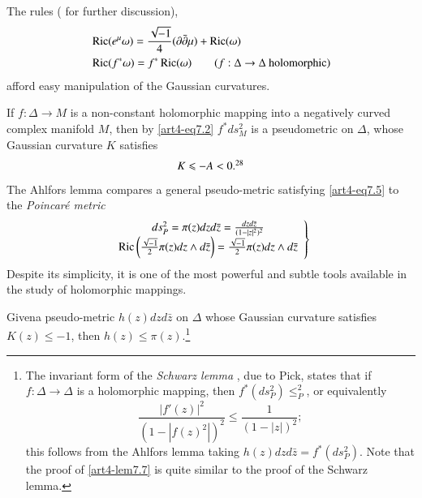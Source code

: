 The rules (\cf \cite{art4-key24} for further discussion),
\begin{align*}
& \operatorname{Ric} (e^\mu \omega) = \frac{\sqrt{-1}}{4} (\partial \bar{\partial} \mu) + \operatorname{Ric} (\omega)\\
& \operatorname{Ric} (f^\ast\omega) = f^\ast \operatorname{Ric} (\omega) \qquad (f: \Delta \to \Delta \text{ holomorphic})
\end{align*}
afford easy manipulation of the Gaussian curvatures.

If $f : \Delta \to M$ is a non-constant holomorphic mapping into a negatively curved complex manifold $M$, then by \eqref{art4-eq7.2} $f^\ast ds^2_M$ is a pseudometric on $\Delta$, whose Gaussian curvature $K$ satisfies
\begin{equation}
K \leqslant - A < 0.\footnotemark[28]{}
\label{art4-eq7.5}
\end{equation}
The Ahlfors lemma compares a general pseudo-metric satisfying \eqref{art4-eq7.5} to the \textit{Poincar\'e metric}
\begin{equation}
\left.
\begin{array}{c}
ds^2_P = \pi (z) dzd\bar{z}= \frac{dzd\bar{z}}{(1-|z|^2)^2}\\
\operatorname{Ric} \left(\frac{\sqrt{-1}}{2} \pi (z) d z \wedge d\bar{z} \right) = \frac{\sqrt{-1}}{2} \pi (z) dz \wedge d \bar{z}
\end{array}
\right\}\label{art4-eq7.6}
\end{equation}
Despite its simplicity, it is one of the most powerful and subtle tools available in the study of holomorphic mappings.

\begin{lemma}[Ahlfors]\label{art4-lem7.7}
Given\pageoriginale a pseudo-metric $h(z)dzd\bar{z}$ on $\Delta$ whose Gaussian curvature satisfies $K(z) \leqslant -1$, then $h (z) \leqslant \pi (z)$.\footnote[29]{The invariant form of the \textit{Schwarz lemma} \cite{art4-key28}, due to Pick, states that if $f : \Delta \to \Delta$ is a holomorphic mapping, then $f^\ast (ds^2_P) \leqslant^2_P$, or equivalently
$$
\dfrac{|f'(z)|^2}{(1 -|f(z)^2|)^2} \leqslant \frac{1}{(1-|z|)^2};
$$
this follows from the Ahlfors lemma taking $h(z) dz d \bar{z} = f^\ast (ds^2_P)$. Note that the proof of \eqref{art4-lem7.7} is quite similar to the proof of the Schwarz lemma.}
\end{lemma}

